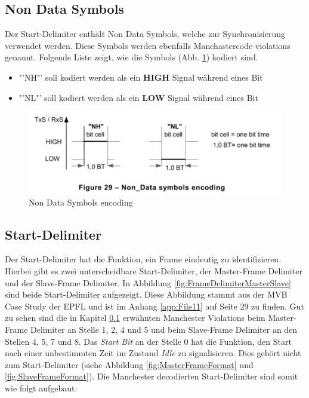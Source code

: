 \subsection{Non Data Symbols} 
\label{sub:NonDataSymbols}
Der Start-Delimiter enthält Non Data Symbols, welche zur Synchronisierung verwendet werden. Diese Symbols werden ebenfalls Manchastercode violations genannt. Folgende Liste zeigt, wie die Symbols (Abb. \ref{fig:NonDataSymbolsEncoding}) kodiert sind.

\begin{itemize}
    \item "'NH"' soll kodiert werden als ein \textbf{HIGH} Signal während eines Bit 
    \item "'NL"' soll kodiert werden als ein \textbf{LOW} Signal während eines Bit
\end{itemize}

\begin{figure}[H]
    \centering
    \includegraphics[width = 0.7 \textwidth]{Figures/Chap2/Grundlagen/MVB_DOKU/Layer/Non_Data_Symbol.png}
    \caption{Non Data Symbols encoding}
    \label{fig:NonDataSymbolsEncoding}
\end{figure}

\subsection{Start-Delimiter}
\label{sub:StartDelimiter}
Der Start-Delimiter hat die Funktion, ein Frame eindeutig zu identifizieren. Hierbei gibt es zwei unterscheidbare Start-Delimiter, der Master-Frame Delimiter und der Slave-Frame Delimiter. In Abbildung \ref{fig:FrameDelimiterMasterSlave} sind beide Start-Delimiter aufgezeigt. Diese Abbildung stammt aus der MVB Case Study der EPFL und ist im Anhang \ref{app:File11} auf Seite 29 zu finden. Gut zu sehen sind die in Kapitel \ref{sub:NonDataSymbols} erwähnten Manchester Violations beim Master-Frame Delimiter an Stelle 1, 2, 4 und 5 und beim Slave-Frame Delimiter an den Stellen 4, 5, 7 und 8. Das \textit{Start Bit} an der Stelle 0 hat die Funktion, den Start nach einer unbestimmten Zeit im Zustand \textit{Idle} zu signalisieren. Dies gehört nicht zum Start-Delimiter (siehe Abbildung \ref{fig:MasterFrameFormat} und \ref{fig:SlaveFrameFormat}). Die Manchester decodierten Start-Delimiter sind somit wie folgt aufgebaut:

